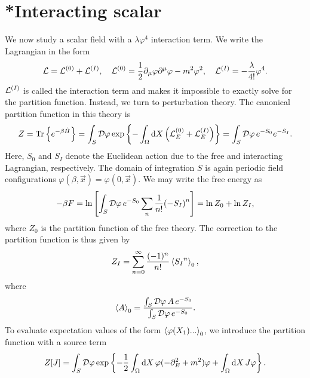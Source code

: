 \section{*Interacting scalar}
\label{section: interacting scalar}


We now study a scalar field with a $\lambda \varphi^4$ interaction term.
We write the Lagrangian in the form
%
\begin{equation*}
    \mathcal{L} = \mathcal{L}^{(0)} + \mathcal{L}^{(I)}, \quad 
    \mathcal{L}^{(0)} = 
    \frac{1}{2} \partial_\mu \varphi \partial^\mu \varphi - m^2 \varphi^2 , \quad
    \mathcal{L}^{(I)} = - \frac{\lambda}{4!} \varphi^4.
\end{equation*}
%
$\mathcal{L}^{(I)}$ is called the interaction term and makes it impossible to exactly solve for the partition function.
Instead, we turn to perturbation theory.
The canonical partition function in this theory is
%
\begin{equation}
    Z = \text{Tr} \left\{ e^{- \beta \hat H} \right\}
    = \int_S \mathcal D \varphi \, \text{exp} \left\{ 
        - \int_\Omega \text{d} X \left(\mathcal{L}_E^{(0)} + \mathcal{L}_E^{(I)}\right)
     \right\}
    = \int_S \mathcal D \varphi \, e^{-S_0} e^{-S_I}.
\end{equation}
%
Here, $S_0$ and $S_I$ denote the Euclidean action due to the free and interacting Lagrangian, respectively.
The domain of integration $S$ is again periodic field configurations $\varphi(\beta, \vec x) = \varphi(0, \vec x)$.
We may write the free energy as
%
\begin{equation*}
    - \beta F = \ln
    \left[
        \int_S \mathcal D \varphi \, e^{-S_0} \sum_n \frac{1}{n!} {(-S_I)}^n
    \right]
    = \ln Z_0 
    + \ln Z_I ,
\end{equation*}
%
where $Z_0$ is the partition function of the free theory.
The correction to the partition function is thus given by
%
\begin{equation}
    Z_I = \sum_{n=0}^\infty \frac{(-1)^n}{n!} \left\langle {S_I}^n \right\rangle_0,
\end{equation}
%
where
%
\begin{equation}
    \left\langle A \right\rangle_0 = \frac{
        \int_S \mathcal D \varphi \, A \, e^{-S_0} }
    {\int_S \mathcal D \varphi \, e^{-S_0}}.
\end{equation}
%
To evaluate expectation values of the form $\left\langle \varphi(X_1) ...  \right\rangle_0$, we introduce the partition function with a source term
%
\begin{align}
    Z[J] = \int_S \mathcal D \varphi \, \text{exp} \left\{ 
        - \frac{1}{2} \int_\Omega \text{d} X \, \varphi (-\partial_E^2 + m^2) \varphi
        + \int_\Omega \text{d} X \, J \varphi
     \right\}.
\end{align}
